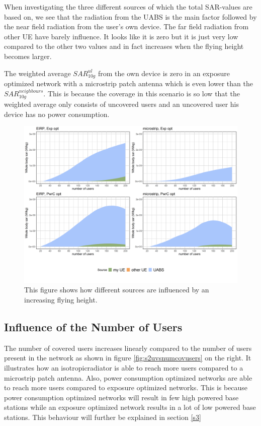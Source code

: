 When investigating the three different sources of which the total \gls{SAR}-values are based on, we see 
that the radiation from the \gls{UABS} is the main factor followed by the near field radiation from the user's own device.
The far field radiation from other \gls{UE} have barely influence. 
It looks like it is zero but it is just very low compared to the other two values and in fact increases when the flying height becomes larger.

The weighted average $SAR^{ul}_{10g}$ from the own device is zero in an exposure optimized network with a microstrip patch antenna which is even lower than the $SAR^{neighbours}_{10g}$.
This is because the coverage in this scenario is so low that the weighted average only consists of uncovered users and an uncovered user his device has no power consumption.

\begin{figure}[]
  \includegraphics[width=\textwidth]{../results/s2/fhFourSources.png}
  \caption{This figure shows how different sources are influenced by an increasing flying height.}
  \label{fig:s2shfourSourcesMatrix}
\end{figure}

\FloatBarrier
\subsection{Influence of the Number of Users}
\label{s2b}

The number of covered users increases linearly compared to the number of users present in the network as shown in figure 
\ref{fig:s2uvsnumcovusers} on the right. It illustrates how an \gls{isotropicradiator} is able to reach more users 
compared to a microstrip patch antenna. Also, power consumption optimized networks are able to reach more users compared to exposure optimized networks.
This is because power consumption optimized networks will result in few high powered base stations while an 
exposure optimized network results in a lot of low powered base stations. This behaviour will further be explained in section \ref{s3}

